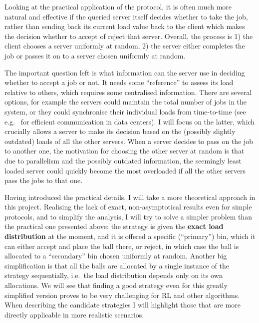Looking at the practical application of the \TwoThinning protocol, it is often much more natural and effective if the queried server itself decides whether to take the job, rather than sending back its current load value back to the client which makes the decision whether to accept of reject that server.  Overall, the process is 1) the client chooses a server uniformly at random, 2) the server either completes the job or passes it on to a server chosen uniformly at random.

The important question left is what information can the server use in deciding whether to accept a job or not. It needs some ``reference'' to assess its load relative to others, which requires some centralised information. There are several options, for example the servers could maintain the total number of jobs in the system, or they could synchronise their individual loads from time-to-time (see e.g.~\cite{zhang2018datacenterloadbalancing} for efficient communication in data centers). I will focus on the latter, which crucially allows a server to make its decision based on the (possibly slightly outdated) loads of all the other servers. When a server decides to pass on the job to another one, the motivation for choosing the other server at random is that due to parallelism and the possibly outdated information, the seemingly least loaded server could quickly become the most overloaded if all the other servers pass the jobs to that one.


Having introduced the practical details, I will take a more theoretical approach in this project. Realising the lack of exact, non-asymptotical results even for simple protocols, and to simplify the analysis, I will try to solve a simpler problem than the practical one presented above: the strategy is given the \textbf{exact load distribution} at the moment, and it is offered a specific (``primary'') bin, which it can either accept and place the ball there, or reject, in which case the ball is allocated to a ``secondary'' bin chosen uniformly at random. Another big simplification is that all the balls are allocated by a single instance of the strategy sequentially, i.e.\ the load distribution depends only on its own allocations. We will see that finding a good strategy even for this greatly simplified version proves to be very challenging for RL and other algorithms. When describing the candidate strategies I will highlight those that are more directly applicable in more realistic scenarios. 


